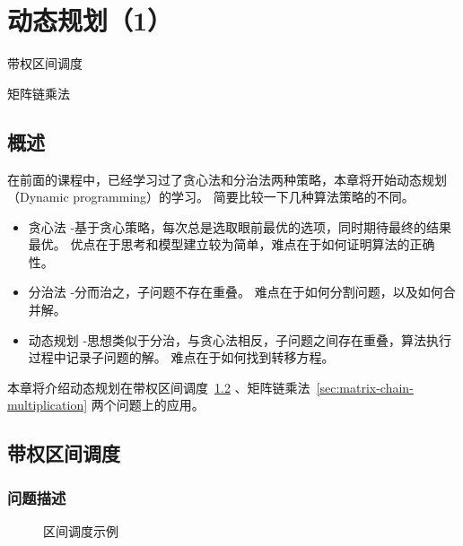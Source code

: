 \chapter{动态规划（1）}

\begin{introduction}
  \item 带权区间调度
  \item 矩阵链乘法
\end{introduction}

\section{概述}
在前面的课程中，已经学习过了贪心法和分治法两种策略，本章将开始动态规划（Dynamic programming）的学习。
简要比较一下几种算法策略的不同。

\begin{itemize}
  \item 贪心法 -基于贪心策略，每次总是选取眼前最优的选项，同时期待最终的结果最优。
        优点在于思考和模型建立较为简单，难点在于如何证明算法的正确性。
  \item 分治法 -分而治之，子问题不存在重叠。
        难点在于如何分割问题，以及如何合并解。
  \item 动态规划 -思想类似于分治，与贪心法相反，子问题之间存在重叠，算法执行过程中记录子问题的解。
        难点在于如何找到转移方程。
\end{itemize}

本章将介绍动态规划在带权区间调度~\ref{sec:weighted-interval-scheduling} 、矩阵链乘法~\ref{sec:matrix-chain-multiplication} 两个问题上的应用。

\section{带权区间调度}\label{sec:weighted-interval-scheduling}

\subsection{问题描述}

\begin{figure}[hbt!]
  \centering
  \caption{区间调度示例}\label{fig:wis-picture-1}
\end{figure}

